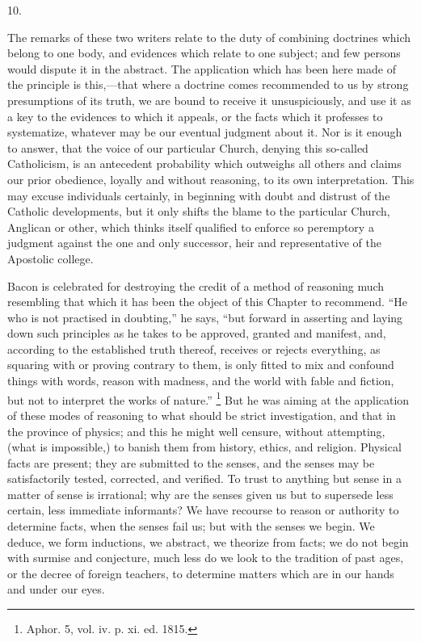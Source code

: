 10.

The remarks of these two writers relate to the duty of
combining doctrines which belong to one body, and
evidences which relate to one subject; and few persons
would dispute it in the abstract. The application which
has been here made of the principle is this,—that
where a doctrine comes recommended to us by strong
presumptions of its truth, we are bound to receive it
unsuspiciously, and use it as a key to the evidences to
which it appeals, or the facts which it professes to
systematize, whatever may be our eventual judgment about
it. Nor is it enough to answer, that the voice of our
particular Church, denying this so-called Catholicism, is
an antecedent probability which outweighs all others and
claims our prior obedience, loyally and without
reasoning, to its own interpretation. This may excuse
individuals certainly, in beginning with doubt and
distrust of the Catholic developments, but it only shifts
the blame to the particular Church, Anglican or other,
which thinks itself qualified to enforce so peremptory a
judgment against the one and only successor, heir and
representative of the Apostolic college.


Bacon is celebrated for destroying the credit of a
method of reasoning much resembling that which it has
been the object of this Chapter to recommend. ``He
who is not practised in doubting,'' he says,
``but forward in asserting and laying down such
principles as he takes to be approved, granted and
manifest, and, according to the established truth
thereof, receives or rejects everything, as squaring with
or proving contrary to them, is only fitted to mix and
confound things with words, reason with madness, and the
world with fable and fiction, but not to interpret the
works of nature.'' \footnote{Aphor. 5, vol. iv. p. xi. ed.
1815.} But he was aiming at the
application of these modes of reasoning to what should be
strict investigation, and that in the province of
physics; and this he might well censure, without
attempting, (what is impossible,) to banish them from
history, ethics, and religion. Physical facts are
present; they are submitted to the senses, and the senses
may be satisfactorily tested, corrected, and verified. To
trust to anything but sense in a matter of sense is
irrational; why are the senses given us but to supersede
less certain, less immediate informants? We have recourse
to reason or authority to determine facts, when the
senses fail us; but with the senses we begin. We deduce,
we form inductions, we abstract, we theorize from facts;
we do not begin with surmise and conjecture, much less do
we look to the tradition of past ages, or the decree of
foreign teachers, to determine matters which are in our
hands and under our eyes.

